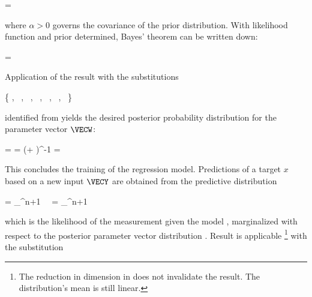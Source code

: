     \startformula
        \RPRIOR = \GAUSS{\VECW}{\VECZERO}{\ALPHAI \MATID}
    \stopformula

    where $\alpha > 0$ governs the covariance of the prior distribution. With
    likelihood function and prior determined, Bayes' theorem can be written
    down:

    \startformula
        \RPOSTERIOR = \frac{\RLIKELIHOOD \, \RPRIOR}{\RNORMALIZATION} \EQSTOP
    \stopformula

    Application of the result  with the substitutions

    \startformula
        \{ \VECX \rightarrow \VECW,~
            \VECA \rightarrow \VECZERO,~
            \MATP \rightarrow \alpha \MATID,~
            \VECY \rightarrow \VECX,~
            \MATB \rightarrow \MATPHI,~
            \VECB \rightarrow \VECZERO,~
            \MATQ \rightarrow \beta \MATID
            \}
    \stopformula

    identified from  yields the desired posterior
    probability distribution for the parameter vector $\VECW$:

    \placesubformula
    \startformula
    \startalign[n=2,align={right,left}]
        \NC \RPOSTERIOR = \NC \GAUSS{\VECW}{\MEANVEC}{\COVMAT} 
        \NC \COVMAT = \NC (\beta \MATPHIT \MATPHI + \alpha \MATID)^{-1} 
        \NC \MEANVEC = \NC \beta \COVMAT \MATPHIT \VECX \EQSTOP {}
    \stopalign
    \stopformula
    \stopsubformulas

    This concludes the training of the regression model. Predictions of
    a target $x$ based on a new input $\VECY$ are obtained from the predictive
    distribution

    \startformula
    \startalign[n=2,align={right,left}]
        \NC \RPREDICT = \NC
            \int_{\REALS^{n+1}}  \,
            \RPOSTERIOR \, \diff \VECW \NR
        \NC = \NC
            \int_{\REALS^{n+1}}  \,
                \GAUSS{\VECW}{\MEANVEC}{\COVMAT} \,\diff \VECW \NR
    \stopalign
    \stopformula
    
    which is the likelihood of the measurement given the model
    , marginalized with respect to the posterior
    parameter vector distribution . Result
     is applicable \footnote{The reduction in dimension in
     does not invalidate the result. The distribution's
    mean is still linear.} with the substitution

